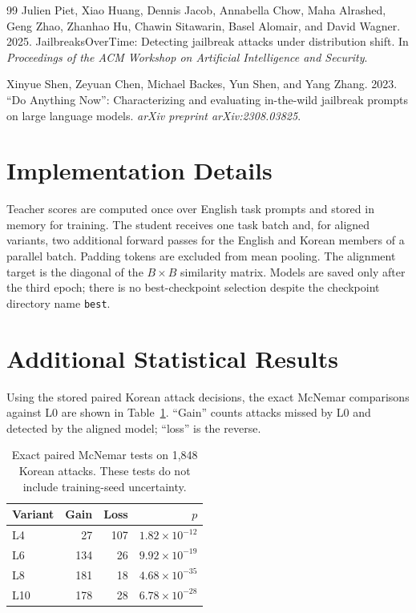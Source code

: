 \documentclass[10pt,twocolumn]{article}
\begin{document}
\begin{thebibliography}{99}
Julien Piet, Xiao Huang, Dennis Jacob, Annabella Chow, Maha Alrashed,
Geng Zhao, Zhanhao Hu, Chawin Sitawarin, Basel Alomair, and David Wagner. 2025.
\newblock JailbreaksOverTime: Detecting jailbreak attacks under distribution
shift.
\newblock In \emph{Proceedings of the ACM Workshop on Artificial Intelligence
and Security}.

Xinyue Shen, Zeyuan Chen, Michael Backes, Yun Shen, and Yang Zhang. 2023.
\newblock ``Do Anything Now'': Characterizing and evaluating in-the-wild
jailbreak prompts on large language models.
\newblock \emph{arXiv preprint arXiv:2308.03825}.

\end{thebibliography}

\appendix

\section{Implementation Details}

Teacher scores are computed once over English task prompts and stored in memory
for training. The student receives one task batch and, for aligned variants,
two additional forward passes for the English and Korean members of a parallel
batch. Padding tokens are excluded from mean pooling. The alignment target is
the diagonal of the $B\times B$ similarity matrix. Models are saved only after
the third epoch; there is no best-checkpoint selection despite the checkpoint
directory name \texttt{best}.

\section{Additional Statistical Results}

Using the stored paired Korean attack decisions, the exact McNemar comparisons
against L0 are shown in Table~\ref{tab:mcnemar}. ``Gain'' counts attacks missed
by L0 and detected by the aligned model; ``loss'' is the reverse.

\begin{table}[h]
\centering
\small
\begin{tabular}{lrrr}
\toprule
Variant & Gain & Loss & $p$ \\
\midrule
L4 & 27 & 107 & $1.82\times10^{-12}$ \\
L6 & 134 & 26 & $9.92\times10^{-19}$ \\
L8 & 181 & 18 & $4.68\times10^{-35}$ \\
L10 & 178 & 28 & $6.78\times10^{-28}$ \\
\bottomrule
\end{tabular}
\caption{Exact paired McNemar tests on 1,848 Korean attacks. These tests do not
include training-seed uncertainty.}
\label{tab:mcnemar}
\end{table}
\end{document}
